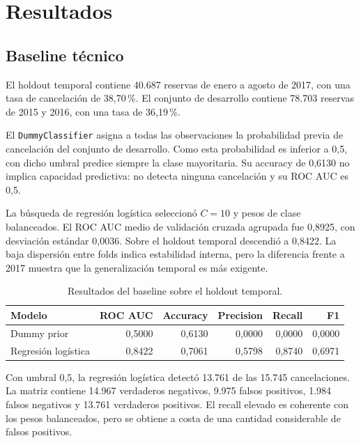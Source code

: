 \section{Resultados}

\subsection{Baseline técnico}

El holdout temporal contiene 40.687 reservas de enero a agosto de 2017, con
una tasa de cancelación de 38,70\,\%. El conjunto de desarrollo contiene
78.703 reservas de 2015 y 2016, con una tasa de 36,19\,\%.

El \texttt{DummyClassifier} asigna a todas las observaciones la probabilidad
previa de cancelación del conjunto de desarrollo. Como esta probabilidad es
inferior a 0,5, con dicho umbral predice siempre la clase mayoritaria. Su
accuracy de 0,6130 no implica capacidad predictiva: no detecta ninguna
cancelación y su ROC AUC es 0,5.

La búsqueda de regresión logística seleccionó $C=10$ y pesos de clase
balanceados. El ROC AUC medio de validación cruzada agrupada fue 0,8925, con
desviación estándar 0,0036. Sobre el holdout temporal descendió a 0,8422. La
baja dispersión entre folds indica estabilidad interna, pero la diferencia
frente a 2017 muestra que la generalización temporal es más exigente.

\begin{table}[htbp]
    \centering
    \caption{Resultados del baseline sobre el holdout temporal.}
    \label{tab:baseline-results}
    \begin{tabular}{lrrrrr}
        \toprule
        Modelo & ROC AUC & Accuracy & Precision & Recall & F1 \\
        \midrule
        Dummy prior & 0,5000 & 0,6130 & 0,0000 & 0,0000 & 0,0000 \\
        Regresión logística & 0,8422 & 0,7061 & 0,5798 & 0,8740 & 0,6971 \\
        \bottomrule
    \end{tabular}
\end{table}

Con umbral 0,5, la regresión logística detectó 13.761 de las 15.745
cancelaciones. La matriz contiene 14.967 verdaderos negativos, 9.975 falsos
positivos, 1.984 falsos negativos y 13.761 verdaderos positivos. El recall
elevado es coherente con los pesos balanceados, pero se obtiene a costa de una
cantidad considerable de falsos positivos.

